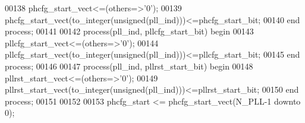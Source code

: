 \begin{DoxyCode}
00138     \textcolor{vhdlchar}{phcfg_start_vect}\textcolor{vhdlchar}{<=}\textcolor{vhdlchar}{(}\textcolor{keywordflow}{others}\textcolor{vhdlchar}{=}\textcolor{vhdlchar}{>}\textcolor{vhdlchar}{'}\textcolor{vhdllogic}{}\textcolor{vhdllogic}{0}\textcolor{vhdlchar}{'}\textcolor{vhdlchar}{)};
00139     \textcolor{vhdlchar}{phcfg_start_vect}\textcolor{vhdlchar}{(}\textcolor{vhdlchar}{to\_integer}\textcolor{vhdlchar}{(}\textcolor{comment}{unsigned}\textcolor{vhdlchar}{(}\textcolor{vhdlchar}{pll_ind}\textcolor{vhdlchar}{)}\textcolor{vhdlchar}{)}\textcolor{vhdlchar}{)}\textcolor{vhdlchar}{<=}\textcolor{vhdlchar}{phcfg_start_bit};
00140 \textcolor{keywordflow}{end} \textcolor{keywordflow}{process};
00141 
00142 \textcolor{keywordflow}{process}(pll_ind, pllcfg_start_bit) \textcolor{keywordflow}{begin}
00143     \textcolor{vhdlchar}{pllcfg_start_vect}\textcolor{vhdlchar}{<=}\textcolor{vhdlchar}{(}\textcolor{keywordflow}{others}\textcolor{vhdlchar}{=}\textcolor{vhdlchar}{>}\textcolor{vhdlchar}{'}\textcolor{vhdllogic}{}\textcolor{vhdllogic}{0}\textcolor{vhdlchar}{'}\textcolor{vhdlchar}{)};
00144     \textcolor{vhdlchar}{pllcfg_start_vect}\textcolor{vhdlchar}{(}\textcolor{vhdlchar}{to\_integer}\textcolor{vhdlchar}{(}\textcolor{comment}{unsigned}\textcolor{vhdlchar}{(}\textcolor{vhdlchar}{pll_ind}\textcolor{vhdlchar}{)}\textcolor{vhdlchar}{)}\textcolor{vhdlchar}{)}\textcolor{vhdlchar}{<=}\textcolor{vhdlchar}{pllcfg_start_bit};
00145 \textcolor{keywordflow}{end} \textcolor{keywordflow}{process};
00146 
00147 \textcolor{keywordflow}{process}(pll_ind, pllrst_start_bit) \textcolor{keywordflow}{begin}
00148     \textcolor{vhdlchar}{pllrst_start_vect}\textcolor{vhdlchar}{<=}\textcolor{vhdlchar}{(}\textcolor{keywordflow}{others}\textcolor{vhdlchar}{=}\textcolor{vhdlchar}{>}\textcolor{vhdlchar}{'}\textcolor{vhdllogic}{}\textcolor{vhdllogic}{0}\textcolor{vhdlchar}{'}\textcolor{vhdlchar}{)};
00149     \textcolor{vhdlchar}{pllrst_start_vect}\textcolor{vhdlchar}{(}\textcolor{vhdlchar}{to\_integer}\textcolor{vhdlchar}{(}\textcolor{comment}{unsigned}\textcolor{vhdlchar}{(}\textcolor{vhdlchar}{pll_ind}\textcolor{vhdlchar}{)}\textcolor{vhdlchar}{)}\textcolor{vhdlchar}{)}\textcolor{vhdlchar}{<=}\textcolor{vhdlchar}{pllrst_start_bit};
00150 \textcolor{keywordflow}{end} \textcolor{keywordflow}{process};
00151 
00152 
00153 \textcolor{vhdlchar}{phcfg_start}  \textcolor{vhdlchar}{<=} \textcolor{vhdlchar}{phcfg_start_vect}\textcolor{vhdlchar}{(}\textcolor{vhdlchar}{N_PLL}\textcolor{vhdlchar}{-}\textcolor{vhdllogic}{}\textcolor{vhdllogic}{1} \textcolor{keywordflow}{downto} \textcolor{vhdllogic}{}\textcolor{vhdllogic}{0}\textcolor{vhdlchar}{)};

\end{DoxyCode}
